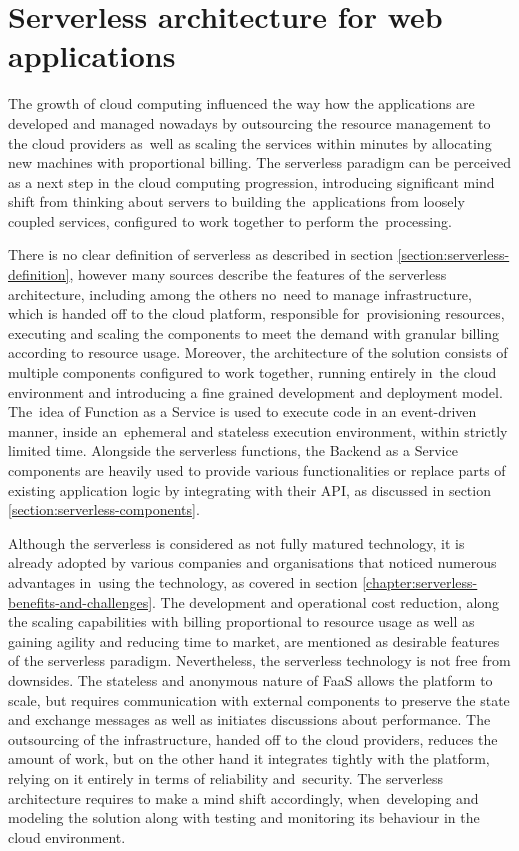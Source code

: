 \chapter{Serverless architecture for web applications}

The growth of cloud computing influenced the way how the applications are developed and managed nowadays by outsourcing the resource management to the cloud providers as~well as scaling the services within minutes by allocating new machines with proportional billing. The serverless paradigm can be perceived as a next step in the cloud computing progression, introducing significant mind shift from thinking about servers to building the~applications from loosely coupled services, configured to work together to perform the~processing.

There is no clear definition of serverless as described in section \ref{section:serverless-definition}, however many sources describe the features of the serverless architecture, including among the others no~need to manage infrastructure, which is handed off to the cloud platform, responsible for~provisioning resources, executing and scaling the components to meet the demand with granular billing according to resource usage. Moreover, the architecture of the solution consists of multiple components configured to work together, running entirely in~the cloud environment and introducing a fine grained development and deployment model.
The~idea of Function as a Service is used to execute code in an event-driven manner, inside an~ephemeral and stateless execution environment, within strictly limited time. Alongside the serverless functions, the Backend as a Service components are heavily used to provide various functionalities or replace parts of existing application logic by integrating with their API, as discussed in section \ref{section:serverless-components}.

Although the serverless is considered as not fully matured technology, it is already adopted by various companies and organisations that noticed numerous advantages in~using the technology, as covered in section \ref{chapter:serverless-benefits-and-challenges}.
The development and operational cost reduction, along the scaling capabilities with billing proportional to resource usage as well as gaining agility and reducing time to market, are mentioned as desirable features of the serverless paradigm.
Nevertheless, the serverless technology is not free from downsides. The stateless and anonymous nature of FaaS allows the platform to scale, but requires communication with external components to preserve the state and exchange messages as well as initiates discussions about performance. The outsourcing of the infrastructure, handed off to the cloud providers, reduces the amount of work, but on the other hand it integrates tightly with the platform, relying on it entirely in terms of reliability and~security. The serverless architecture requires to make a mind shift accordingly, when~developing and modeling the solution along with testing and monitoring its behaviour in the cloud environment.

